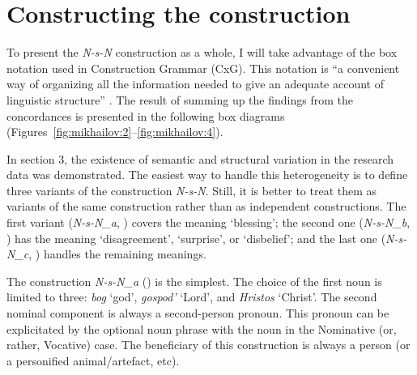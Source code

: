 \documentclass[output=paper]{langscibook}
\begin{document}
\section{Constructing the construction}

To present the \textit{N-s-N} construction as a whole, I will take advantage of the box notation used in Construction Grammar (CxG). This notation is “a convenient way of organizing all the information needed to give an adequate account of linguistic structure” \citep[13]{FriedÖstman2004}. The result of summing up the findings from the concordances is presented in the following box diagrams (Figures~\ref{fig:mikhailov:2}--\ref{fig:mikhailov:4}).

In section 3, the existence of semantic and structural variation in the research data was demonstrated. The easiest way to handle this heterogeneity is to define three variants of the construction \textit{N-s-N}. Still, it is better to treat them as variants of the same construction rather than as independent constructions. The first variant (\textit{N-s-N\_a}, ) covers the meaning ‘blessing’; the second one (\textit{N-s-N\_b}, ) has the meaning ‘disagreement’, ‘surprise’, or ‘disbelief’; and the last one (\textit{N-s-N\_c}, ) handles the remaining meanings.

The construction \textit{N-s-N\_a} () is the simplest. The choice of the first noun is limited to three: \textit{bog} ‘god’, \textit{gospod’} ‘Lord’, and \textit{Hristos} ‘Christ’. The second nominal component is always a second-person pronoun. This pronoun can be explicitated by the optional noun phrase with the noun in the Nominative (or, rather, Vocative) case. The beneficiary of this construction is always a person (or a personified animal/artefact, etc).
\end{document}
